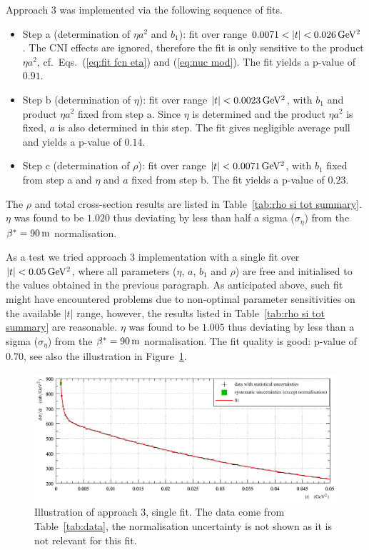 Approach 3 was implemented via the following sequence of fits.
\begin{itemize}
\item Step a (determination of $\eta a^2$ and $b_1$): fit over range $0.0071 < |t| < 0.026\,{\rm GeV^2}$. The CNI effects are ignored, therefore the fit is only sensitive to the product $\eta a^2$, cf.~Eqs.~(\ref{eq:fit fcn eta}) and (\ref{eq:nuc mod}). The fit yields a p-value of $0.91$.
\item Step b (determination of $\eta$): fit over range $|t| < 0.0023\,{\rm GeV^2}$, with $b_1$ and product $\eta a^2$ fixed from step a. Since $\eta$ is determined and the product $\eta a^2$ is fixed, $a$ is also determined in this step. The fit gives negligible average pull and yields a p-value of $0.14$.
\item Step c (determination of $\rho$): fit over range $|t| < 0.0071\,{\rm GeV^2}$, with $b_1$ fixed from step a and $\eta$ and $a$ fixed from step b. The fit yields a p-value of $0.23$.
\end{itemize}
The $\rho$ and total cross-section results are listed in Table~\ref{tab:rho si tot summary}. $\eta$ was found to be $1.020$ thus deviating by less than half a sigma ($\sigma_\eta$) from the $\beta^* = 90\,{\rm m}$ normalisation.

As a test we tried approach 3 implementation with a single fit over $|t| < 0.05\,{\rm GeV^2}$, where all parameters ($\eta$, $a$, $b_1$ and $\rho$) are free and initialised to the values obtained in the previous paragraph. As anticipated above, such fit might have encountered problems due to non-optimal parameter sensitivities on the available $|t|$ range, however, the results listed in Table~\ref{tab:rho si tot summary} are reasonable. $\eta$ was found to be $1.005$ thus deviating by less than a sigma ($\sigma_\eta$) from the $\beta^* = 90\,{\rm m}$ normalisation. The fit quality is good: p-value of $0.70$, see also the illustration in Figure~\ref{fig:approach 3 single fit}.


\begin{figure}
\begin{center}
\includegraphics{fig/approach3_single_fit.pdf}
\caption{Illustration of approach 3, single fit. The data come from Table~\ref{tab:data}, the normalisation uncertainty is not shown as it is not relevant for this fit.
}
\label{fig:approach 3 single fit}
\end{center}
\end{figure}


